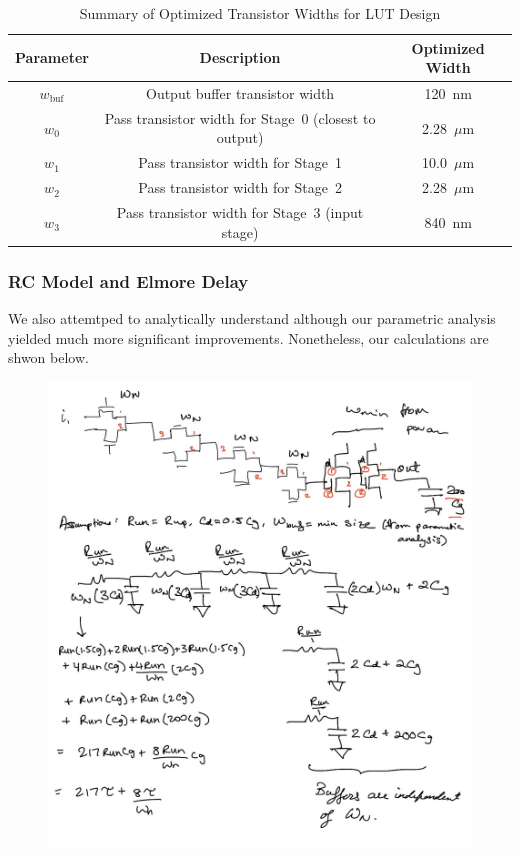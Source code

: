 \documentclass[12pt]{article}
\begin{document}
\begin{table}[H]
\centering

\begin{tabular}{|c|c|c|}
\hline
\textbf{Parameter} & \textbf{Description} & \textbf{Optimized Width} \\ \hline
$w_{\text{buf}}$ & Output buffer transistor width & 120~nm \\ \hline
$w_{0}$ & Pass transistor width for Stage~0 (closest to output) & 2.28~$\mu$m \\ \hline
$w_{1}$ & Pass transistor width for Stage~1 & 10.0~$\mu$m \\ \hline
$w_{2}$ & Pass transistor width for Stage~2 & 2.28~$\mu$m \\ \hline
$w_{3}$ & Pass transistor width for Stage~3 (input stage) & 840~nm \\ \hline
\end{tabular}
\label{tab:optimized_widths}
\caption{Summary of Optimized Transistor Widths for LUT Design}
\end{table}

\newpage

\subsubsection*{RC Model and Elmore Delay}

We also attemtped to analytically understand although our parametric analysis yielded much more significant improvements. Nonetheless, our calculations are shwon below.

\begin{figure}[H]
    \centering
    \includegraphics[width=\linewidth]{writeup//figures/elmore.jpeg}
    \caption{}
\end{figure}
\end{document}
